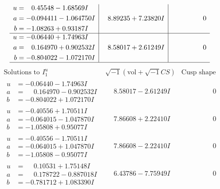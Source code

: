 \documentclass[1p]{elsarticle_modified}
\theoremstyle{definition}
\newcommand{\I}{\sqrt{-1}}
\begin{document}
$$\begin{array}{c|c|c}
\begin{aligned}
u &= \phantom{-}0.45548 - 1.68569 I \\
a &= -0.094411 - 1.064750 I \\
b &= -1.08263 + 0.93187 I\end{aligned}
 & \phantom{-}8.89235 + 7.23820 I & \phantom{-0.000000 } 0 \\ \hline\begin{aligned}
u &= -0.06440 + 1.74963 I \\
a &= \phantom{-}0.164970 + 0.902532 I \\
b &= -0.804022 - 1.072170 I\end{aligned}
 & \phantom{-}8.58017 + 2.61249 I & \phantom{-0.000000 } 0\\
 \hline 
 \end{array}$$\newpage$$\begin{array}{c|c|c}  
\text{Solutions to }I^u_{1}& \I (\text{vol} + \sqrt{-1}CS) & \text{Cusp shape}\\
 \hline 
\begin{aligned}
u &= -0.06440 - 1.74963 I \\
a &= \phantom{-}0.164970 - 0.902532 I \\
b &= -0.804022 + 1.072170 I\end{aligned}
 & \phantom{-}8.58017 - 2.61249 I & \phantom{-0.000000 } 0 \\ \hline\begin{aligned}
u &= -0.40556 + 1.70511 I \\
a &= -0.064015 - 1.047870 I \\
b &= -1.05808 + 0.95077 I\end{aligned}
 & \phantom{-}7.86608 + 2.22410 I & \phantom{-0.000000 } 0 \\ \hline\begin{aligned}
u &= -0.40556 - 1.70511 I \\
a &= -0.064015 + 1.047870 I \\
b &= -1.05808 - 0.95077 I\end{aligned}
 & \phantom{-}7.86608 - 2.22410 I & \phantom{-0.000000 } 0 \\ \hline\begin{aligned}
u &= \phantom{-}0.10531 + 1.75148 I \\
a &= \phantom{-}0.178722 - 0.887018 I \\
b &= -0.781712 + 1.083390 I\end{aligned}
 & \phantom{-}6.43786 - 7.75949 I & \phantom{-0.000000 } 0 \\ \hline\begin{aligned}

\end{aligned}
\end{array}$$
\end{document}

